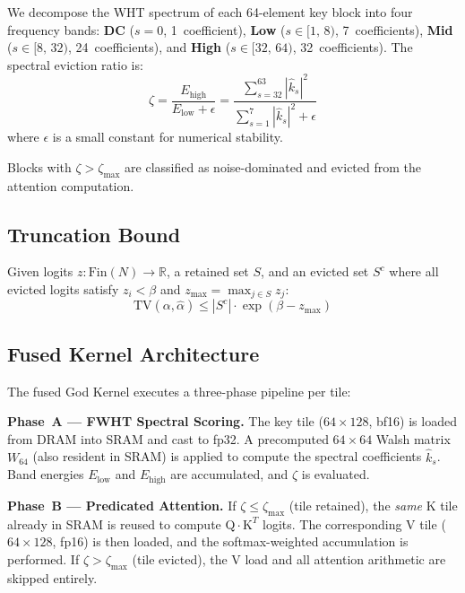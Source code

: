 \documentclass[conference]{IEEEtran}
\begin{document}
We decompose the WHT spectrum of each 64-element key block into four
frequency bands: \textbf{DC} ($s=0$, 1~coefficient),
\textbf{Low} ($s \in [1,\,8)$, 7~coefficients),
\textbf{Mid} ($s \in [8,\,32)$, 24~coefficients), and
\textbf{High} ($s \in [32,\,64)$, 32~coefficients).
The spectral eviction ratio is:
\begin{equation}
\zeta = \frac{E_{\text{high}}}{E_{\text{low}} + \epsilon}
      = \frac{\sum_{s=32}^{63} |\hat{k}_s|^2}{\sum_{s=1}^{7} |\hat{k}_s|^2 + \epsilon}
\end{equation}
where $\epsilon$ is a small constant for numerical stability.

Blocks with $\zeta > \zeta_{\max}$ are classified as noise-dominated
and evicted from the attention computation.

\subsection{Truncation Bound}\label{sec:bound}

\begin{theorem}
Given logits $z : \text{Fin}(N) \to \mathbb{R}$, a retained set $S$,
and an evicted set $S^c$ where all evicted logits satisfy $z_i < \beta$
and $z_{\max} = \max_{j \in S} z_j$:
\begin{equation}
\text{TV}(\alpha, \hat{\alpha}) \leq |S^c| \cdot \exp(\beta - z_{\max})
\end{equation}
\end{theorem}

\subsection{Fused Kernel Architecture}\label{sec:kernel}

The fused God Kernel executes a three-phase pipeline per tile:

\textbf{Phase~A --- FWHT Spectral Scoring.}
The key tile ($64 \times 128$, bf16) is loaded from DRAM into SRAM and
cast to fp32. A precomputed $64 \times 64$ Walsh matrix $W_{64}$
(also resident in SRAM) is applied to compute the spectral
coefficients $\hat{k}_s$. Band energies $E_{\text{low}}$ and
$E_{\text{high}}$ are accumulated, and $\zeta$ is evaluated.

\textbf{Phase~B --- Predicated Attention.}
If $\zeta \leq \zeta_{\max}$ (tile retained), the \emph{same} K tile
already in SRAM is reused to compute $\text{Q} \cdot \text{K}^T$
logits. The corresponding V tile ($64 \times 128$, fp16) is then
loaded, and the softmax-weighted accumulation is performed.
If $\zeta > \zeta_{\max}$ (tile evicted), the V load and all
attention arithmetic are skipped entirely.
\end{document}
